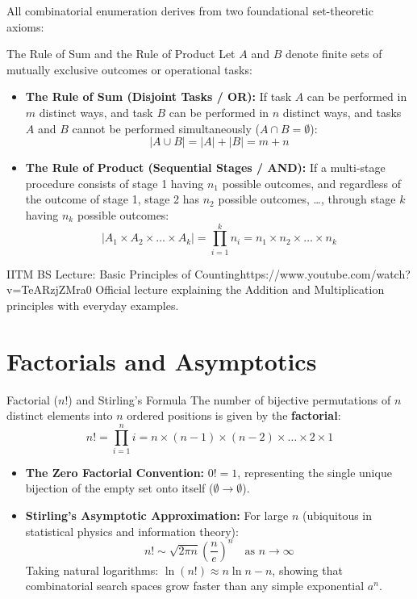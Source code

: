 All combinatorial enumeration derives from two foundational set-theoretic axioms:

\begin{theorembox}{The Rule of Sum and the Rule of Product}
Let $A$ and $B$ denote finite sets of mutually exclusive outcomes or operational tasks:
\begin{itemize}
    \item \textbf{The Rule of Sum (Disjoint Tasks / OR):} If task $A$ can be performed in $m$ distinct ways, and task $B$ can be performed in $n$ distinct ways, and tasks $A$ and $B$ cannot be performed simultaneously ($A \cap B = \emptyset$):
    $$|A \cup B| = |A| + |B| = m + n$$
    \item \textbf{The Rule of Product (Sequential Stages / AND):} If a multi-stage procedure consists of stage 1 having $n_1$ possible outcomes, and regardless of the outcome of stage 1, stage 2 has $n_2$ possible outcomes, \dots, through stage $k$ having $n_k$ possible outcomes:
    $$|A_1 \times A_2 \times \dots \times A_k| = \prod_{i=1}^k n_i = n_1 \times n_2 \times \dots \times n_k$$
\end{itemize}
\end{theorembox}

\begin{videocard}{IITM BS Lecture: Basic Principles of Counting}{https://www.youtube.com/watch?v=TeARzjZMra0}
Official lecture explaining the Addition and Multiplication principles with everyday examples.
\end{videocard}

\section{Factorials and Asymptotics}

\begin{definitionbox}{Factorial ($n!$) and Stirling's Formula}
The number of bijective permutations of $n$ distinct elements into $n$ ordered positions is given by the \textbf{factorial}:
$$n! = \prod_{i=1}^n i = n \times (n-1) \times (n-2) \times \dots \times 2 \times 1$$
\begin{itemize}
    \item \textbf{The Zero Factorial Convention:} $0! = 1$, representing the single unique bijection of the empty set onto itself ($\emptyset \to \emptyset$).
    \item \textbf{Stirling's Asymptotic Approximation:} For large $n$ (ubiquitous in statistical physics and information theory):
    $$n! \sim \sqrt{2\pi n} \left(\frac{n}{e}\right)^n \quad \text{as } n \to \infty$$
    Taking natural logarithms: $\ln(n!) \approx n \ln n - n$, showing that combinatorial search spaces grow faster than any simple exponential $a^n$.
\end{itemize}
\end{definitionbox}

